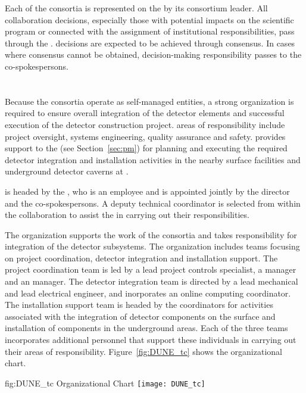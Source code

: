 Each of the consortia is represented on the   by its 
consortium leader.  All collaboration decisions, especially those with potential 
impacts on the  scientific program or connected with the assignment 
of institutional responsibilities, pass through the .   
decisions are expected to be achieved through consensus.  In cases where consensus 
cannot be obtained, decision-making responsibility passes to the co-spokespersons.

\section{}
\label{sec:tc}

Because the consortia operate as self-managed entities, a strong
 organization is required to ensure overall integration of
the detector elements and successful execution of the detector
construction project.   areas of responsibility include project
oversight, systems engineering, quality assurance and safety.
 provides support to the  (see
Section~\ref{sec:pm}) for planning and executing the required detector
integration and installation activities in the nearby surface
facilities and underground detector caverns at \surf.

 is headed by the , who is an 
employee and is appointed jointly by the  director and the
 co-spokespersons.  A deputy technical coordinator is
selected from within the collaboration to assist the  in
carrying out their responsibilities.

The  organization supports the work of the consortia and
takes responsibility for integration of the detector
subsystems.  The organization includes teams focusing on project
coordination, detector integration and installation support.  The
project coordination team is led by a lead project controls
specialist, a  manager and an  manager.  The
detector integration team is directed by a lead mechanical and lead
electrical engineer, and inorporates an online computing coordinator.
The installation support team is headed by the coordinators for
activities associated with the integration of detector components on
the surface and installation of components in the underground areas.
Each of the three teams incorporates additional personnel that support
these individuals in carrying out their areas of responsibility.
Figure~\ref{fig:DUNE_tc} shows the   organizational chart.
\begin{dunefigure}{fig:DUNE_tc}
  {  Organizational Chart}
  \texttt{[image: DUNE\_tc]}
\end{dunefigure}

